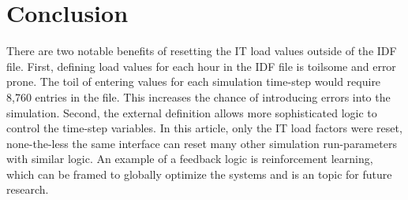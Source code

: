 {%
}



\section{Conclusion}
There are two notable benefits of resetting the IT load values outside of the IDF file. First, defining load values for each hour in the IDF file is toilsome and error prone. The toil of entering values for each simulation time-step would require 8,760 entries in the file. This increases the chance of introducing errors into the simulation. Second, the external definition allows more sophisticated logic to control the time-step variables. In this article, only the IT load factors were reset, none-the-less the same interface can reset many other simulation run-parameters with similar logic. An example of a feedback logic is reinforcement learning, which can be framed to globally optimize the systems and is an topic for future research. 

